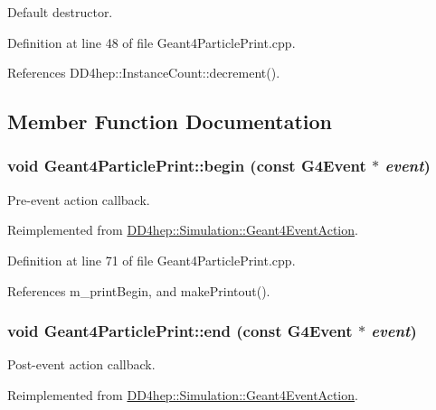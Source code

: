 Default destructor. 

Definition at line 48 of file Geant4ParticlePrint.cpp.

References DD4hep::InstanceCount::decrement().

\subsection{Member Function Documentation}
\hypertarget{class_d_d4hep_1_1_simulation_1_1_geant4_particle_print_ad1a3cbd1ef6837aa2bccb3b01c415d8f}{
\subsubsection[{begin}]{\setlength{\rightskip}{0pt plus 5cm}void Geant4ParticlePrint::begin (const G4Event $\ast$ {\em event})}}
\label{class_d_d4hep_1_1_simulation_1_1_geant4_particle_print_ad1a3cbd1ef6837aa2bccb3b01c415d8f}


Pre-\/event action callback. 

Reimplemented from \hyperlink{class_d_d4hep_1_1_simulation_1_1_geant4_event_action_ad10785d157fa962f4ef2a5361bb0f5da}{DD4hep::Simulation::Geant4EventAction}.

Definition at line 71 of file Geant4ParticlePrint.cpp.

References m\_\-printBegin, and makePrintout().\hypertarget{class_d_d4hep_1_1_simulation_1_1_geant4_particle_print_ad2ba85711f58068667eb94d1f6b80012}{
\subsubsection[{end}]{\setlength{\rightskip}{0pt plus 5cm}void Geant4ParticlePrint::end (const G4Event $\ast$ {\em event})}}
\label{class_d_d4hep_1_1_simulation_1_1_geant4_particle_print_ad2ba85711f58068667eb94d1f6b80012}


Post-\/event action callback. 

Reimplemented from \hyperlink{class_d_d4hep_1_1_simulation_1_1_geant4_event_action_af131bad73c28da3419af7c29e0b8c250}{DD4hep::Simulation::Geant4EventAction}.

